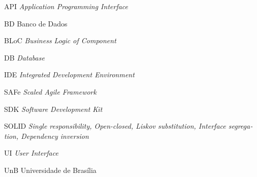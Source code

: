 \documentclass[
	12pt,				%
	oneside,			%
	a4paper,			%
	english,			%
	brazil,				%
	]{abntex2}
\begin{document}
\cleardoublepage

\listoffigures*
\cleardoublepage

\listoftables*
\cleardoublepage

\begin{siglas}
  \item[API] \foreignlanguage{english}{\textit{Application Programming Interface}}
  \item[BD] Banco de Dados
  \item[BLoC] \foreignlanguage{english}{\textit{Business Logic of Component}}
  \item[DB] \foreignlanguage{english}{\textit{Database}}
  \item[IDE] \foreignlanguage{english}{\textit{Integrated Development Environment}}
  \item[SAFe] \foreignlanguage{english}{\textit{Scaled Agile Framework}}
  \item[SDK] \foreignlanguage{english}{\textit{Software Development Kit}}
  \item[SOLID] \foreignlanguage{english}{\textit{Single responsibility, Open-closed, Liskov substitution, Interface segregation, Dependency inversion}}
  \item[UI] \foreignlanguage{english}{\textit{User Interface}}
  \item[UnB] Universidade de Brasília
\end{siglas}


\tableofcontents*
\cleardoublepage


\textual
\end{document}
